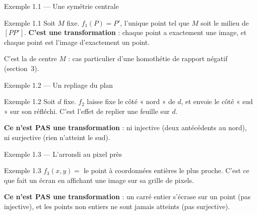 \begin{frame}{Exemple 1.1 --- Une symétrie centrale}
  \begin{Enonce}{Exemple 1.1}
    \small Soit $M$ fixe. $f_1(P) = P'$, l'unique point tel que $M$
    soit le milieu de $[PP']$. \textbf{C'est une transformation} :
    chaque point a exactement une image, et chaque point est l'image
    d'exactement un point.
  \end{Enonce}
  \small C'est la  de centre $M$ : cas
  particulier d'une homothétie de rapport négatif (section~3).
\end{frame}

\begin{frame}{Exemple 1.2 --- Un repliage du plan}
  \begin{Enonce}{Exemple 1.2}
    \small Soit $d$ fixe. $f_2$ laisse fixe le côté « nord » de $d$, et
    envoie le côté « sud » sur son réfléchi. C'est l'effet de replier
    une feuille sur $d$.
  \end{Enonce}
  \textbf{Ce n'est PAS une transformation} : ni injective (deux
  antécédents au nord), ni surjective (rien n'atteint le sud).
\end{frame}

\begin{frame}{Exemple 1.3 --- L'arrondi au pixel près}
  \begin{Enonce}{Exemple 1.3}
    \small $f_3(x,y) = $ le point à coordonnées entières le plus
    proche. C'est ce que fait un écran en affichant une image sur sa
    grille de pixels.
  \end{Enonce}
  \textbf{Ce n'est PAS une transformation} : un carré entier s'écrase
  sur un point (pas injective), et les points non entiers ne sont
  jamais atteints (pas surjective).
\end{frame}
